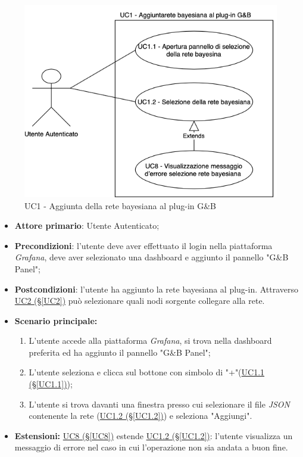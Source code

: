 \begin{figure}[H]
	\begin{center}
		\includegraphics[scale=0.4]{./images/UC1.png}
		 \caption{UC1 - Aggiunta della rete bayesiana al plug-in G\&B}	
	\end{center}
\end{figure}
\begin{itemize}
	\item \textbf{Attore primario}: Utente Autenticato;
	\item \textbf{Precondizioni}: l'utente deve aver effettuato il login nella piattaforma \textit{Grafana}, deve aver selezionato una dashboard e aggiunto il pannello "G\&B Panel";
	\item \textbf{Postcondizioni}: l'utente ha aggiunto la rete bayesiana al plug-in. Attraverso \hyperref[UC2]{UC2 (§\ref*{UC2})} può selezionare quali nodi sorgente collegare alla rete.
	\item \textbf{Scenario principale:}
	\begin{enumerate}
		\item L'utente accede alla piattaforma \textit{Grafana}, si trova nella dashboard preferita ed ha aggiunto il pannello "G\&B Panel";
		\item L'utente seleziona e clicca sul bottone con simbolo di "+"(\hyperref[UC1.1]{UC1.1 (§\ref*{UC1.1})});
		\item L'utente si trova davanti una finestra presso cui selezionare il file \textit{JSON} contenente la rete (\hyperref[UC1.2]{UC1.2 (§\ref*{UC1.2})}) e seleziona "Aggiungi".
	\end{enumerate}
	\item \textbf{Estensioni:} \hyperref[UC8]{UC8 (§\ref*{UC8})} estende \hyperref[UC1.2]{UC1.2 (§\ref*{UC1.2})}: l'utente visualizza un messaggio di errore nel caso in cui l'operazione non sia andata a buon fine.
\end{itemize}

